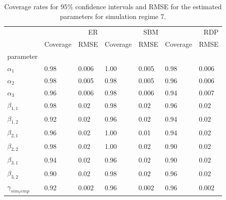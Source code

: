 \begin{table}[ht]
\centering
\caption{Coverage rates for 95\% confidence intervals and RMSE for the estimated parameters for simulation regime 7.}
\label{tab:regime_7_params}
\begin{tabular}{lllllll}
\toprule
 & \multicolumn{2}{r}{ER} & \multicolumn{2}{r}{SBM} & \multicolumn{2}{r}{RDP} \\
 & Coverage & RMSE & Coverage & RMSE & Coverage & RMSE \\
parameter &  &  &  &  &  &  \\
\midrule
$\alpha_{1}$ & 0.98 & 0.006 & 1.00 & 0.005 & 0.98 & 0.006 \\
$\alpha_{2}$ & 0.98 & 0.005 & 0.98 & 0.005 & 0.96 & 0.006 \\
$\alpha_{3}$ & 0.96 & 0.006 & 0.98 & 0.006 & 0.94 & 0.007 \\
$\beta_{1,1}$ & 0.98 & 0.02 & 0.98 & 0.02 & 0.96 & 0.02 \\
$\beta_{1,2}$ & 0.92 & 0.02 & 0.96 & 0.02 & 0.94 & 0.02 \\
$\beta_{2,1}$ & 0.96 & 0.02 & 1.00 & 0.01 & 0.94 & 0.02 \\
$\beta_{2,2}$ & 0.98 & 0.02 & 1.00 & 0.02 & 0.90 & 0.02 \\
$\beta_{3,1}$ & 0.94 & 0.02 & 0.96 & 0.02 & 0.90 & 0.02 \\
$\beta_{3,2}$ & 0.90 & 0.02 & 0.98 & 0.02 & 0.96 & 0.02 \\
$\gamma_{sim_temp}$ & 0.92 & 0.002 & 0.96 & 0.002 & 0.96 & 0.002 \\
\bottomrule
\end{tabular}

\end{table}
